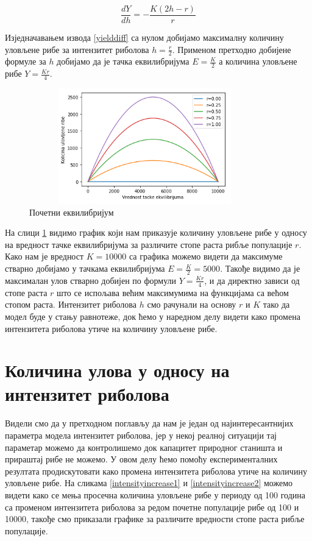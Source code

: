 \documentclass[a4paper]{article}
\begin{document}
{\begin{equation}
    \label{yielddiff}
     \frac{dY}{dh} = -\frac{K(2h - r) }{r}
\end{equation}

Изједначавањем извода \ref{yielddiff} са нулом добијамо максималну количину уловљене рибе за интензитет риболова $h=\frac{r}{2}$. Применом претходно добијене формуле за $h$ добијамо да је тачка еквилибријума $E=\frac{K}{2}$ а количина уловљене рибе $Y=\frac{Kr}{4}$. 

\begin{figure}[h!]
	\centering
	\includegraphics[width=10cm,height=5.0cm]{images/OptimalHarvest.png}
	\caption{Почетни еквилибријум}
	\label{optimalHarvest}
\end{figure}


На слици \ref{optimalHarvest} видимо график који нам приказује количину уловљене рибе у односу на вредност тачке еквилибријума за различите стопе раста рибље популације $r$. Како нам је вредност $K=10000$ са графика можемо видети да максимуме стварно добијамо у тачкама еквилибријума $E=\frac{K}{2}=5000$. Такође видимо да је максималан улов стварно добијен по формули $Y=\frac{Kr}{4}$, и да директно зависи од стопе раста $r$ што се испољава већим максимумима на функцијама са већом стопом раста. Интензитет риболова $h$ смо рачунали на основу $r$ и $K$ тако да модел буде у стању равнотеже, док ћемо у наредном делу видети како промена интензитета риболова утиче на количину уловљене рибе.


\section{Количина улова у односу на интензитет риболова}
\label{sec:fishingintensity}
 Видели смо да у претходном поглављу да нам је један од најинтересантнијих параметра модела интензитет риболова, јер у некој реалној ситуацији тај параметар можемо да контролишемо док капацитет природног станишта и прираштај рибе не можемо. У овом делу ћемо помоћу експерименталних резултата продискутовати како промена интензитета риболова утиче на количину уловљене рибе. На сликама \ref{intensityincrease1} и \ref{intensityincrease2} можемо видети како се мења просечна количина уловљене рибе у периоду од 100 година са променом интензитета риболова за редом почетне популације рибе од 100 и 10000, такође смо приказали графике за различите вредности стопе раста рибље популације.
 
}
\end{document}
